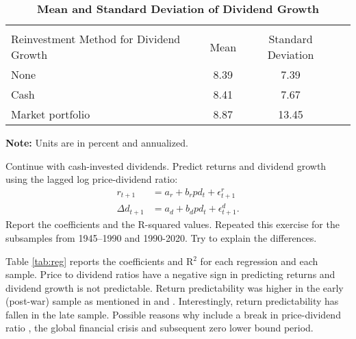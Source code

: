 \medskip
\begin{table}[H]
\caption{\textbf{Mean and Standard Deviation of Dividend Growth}}
\vspace*{-3ex}
 \label{tab:div}
\begin{center}  
\normalsize
\begin{tabular*}{\hsize}{@{\hskip\tabcolsep\extracolsep\fill}l*{3}{c}}
 \toprule\toprule \\[-3ex]

Reinvestment Method for Dividend Growth    & Mean  & Standard Deviation \\
\midrule
None       & 8.39   &  7.39     \\[0.5ex]   
Cash      & 8.41   &  7.67      \\[0.5ex]   
Market portfolio      & 8.87   &  13.45      \\[0.5ex]   
\bottomrule\bottomrule
\end{tabular*}
\end{center}
\begin{minipage}[c]{\textwidth}  \small 
\textbf{Note:} Units are in percent and annualized.
\end{minipage}
\end{table}


\begin{answer}[Part e]
Continue with cash-invested dividends. Predict returns and dividend growth using the lagged log price-dividend ratio:
\begin{align}
r_{t+1} &= a_r + b_r pd_t + \epsilon_{t+1}^r  \label{eq:2e1}\\
\Delta d_{t+1} &= a_d + b_d pd_t + \epsilon_{t+1}^d. \label{eq:2e2}
\end{align}
Report the coefficients and the R-squared values. Repeated this exercise for the subsamples from 1945--1990 and 1990-2020. Try to explain the differences.
\end{answer}

Table \ref{tab:reg} reports the coefficients and R$^2$ for each regression and each sample. Price to dividend ratios have a negative sign in predicting returns and dividend growth is not predictable. Return predictability was higher in the early (post-war) sample as mentioned in \cite{koijen2011} and \cite{chen2009jfe}. Interestingly, return predictability has fallen in the late sample. Possible reasons why include a break in price-dividend ratio \citep{lettauvn2007}, the global financial crisis and subsequent zero lower bound period.

